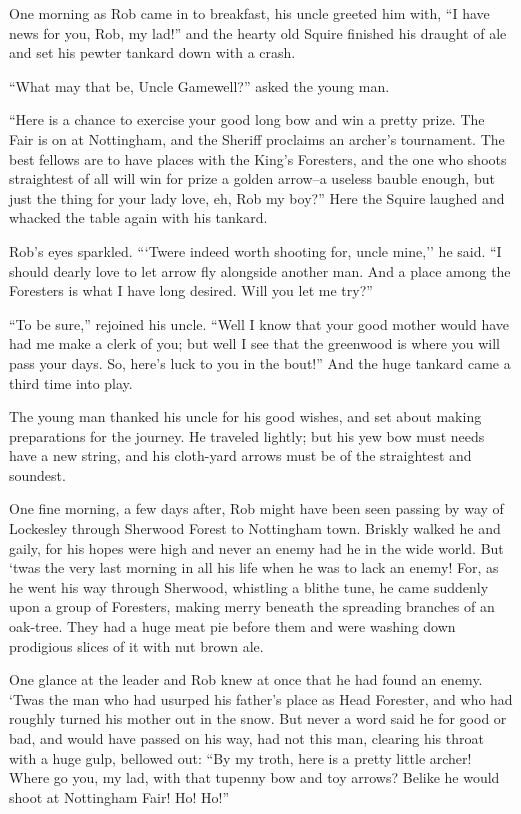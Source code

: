 One morning as Rob came in to breakfast, his uncle greeted him with, ``I
have news for you, Rob, my lad!'' and the hearty old Squire finished his
draught of ale and set his pewter tankard down with a crash.

``What may that be, Uncle Gamewell?'' asked the young man.

``Here is a chance to exercise your good long bow and win a pretty
prize. The Fair is on at Nottingham, and the Sheriff proclaims an
archer's tournament. The best fellows are to have places with the King's
Foresters, and the one who shoots straightest of all will win for prize
a golden arrow--a useless bauble enough, but just the thing for your
lady love, eh, Rob my boy?'' Here the Squire laughed and whacked the
table again with his tankard.

Rob's eyes sparkled. ```Twere indeed worth shooting for, uncle mine,''
he said. ``I should dearly love to let arrow fly alongside another man.
And a place among the Foresters is what I have long desired. Will you
let me try?''

``To be sure,'' rejoined his uncle. ``Well I know that your good mother
would have had me make a clerk of you; but well I see that the greenwood
is where you will pass your days. So, here's luck to you in the bout!''
And the huge tankard came a third time into play.

The young man thanked his uncle for his good wishes, and set about
making preparations for the journey. He traveled lightly; but his yew
bow must needs have a new string, and his cloth-yard arrows must be of
the straightest and soundest.

One fine morning, a few days after, Rob might have been seen passing by
way of Lockesley through Sherwood Forest to Nottingham town. Briskly
walked he and gaily, for his hopes were high and never an enemy had he
in the wide world. But `twas the very last morning in all his life when
he was to lack an enemy! For, as he went his way through Sherwood,
whistling a blithe tune, he came suddenly upon a group of Foresters,
making merry beneath the spreading branches of an oak-tree. They had a
huge meat pie before them and were washing down prodigious slices of it
with nut brown ale.

One glance at the leader and Rob knew at once that he had found an
enemy. `Twas the man who had usurped his father's place as Head
Forester, and who had roughly turned his mother out in the snow. But
never a word said he for good or bad, and would have passed on his way,
had not this man, clearing his throat with a huge gulp, bellowed out:
``By my troth, here is a pretty little archer! Where go you, my lad,
with that tupenny bow and toy arrows? Belike he would shoot at
Nottingham Fair! Ho! Ho!''

